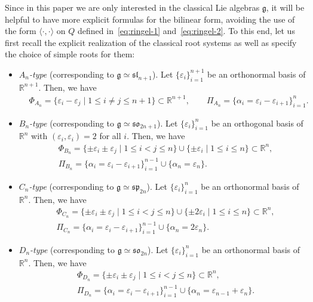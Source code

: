 \documentclass[pdftex]{sigma}
\numberwithin{equation}{section}
\newcommand{\fg}{\mathfrak{g}}
\newcommand{\ssl}{\mathfrak{sl}}
\newcommand{\sso}{\mathfrak{so}}
\newcommand{\ssp}{\mathfrak{sp}}
\begin{document}
Since in this paper we are only interested in the classical Lie algebras $\fg$, it will be helpful to have more explicit formulas for the bilinear form, avoiding the use of the form $\langle \cdot,\cdot \rangle$ on $Q$ defined in~\eqref{eq:ringel-1} and~\eqref{eq:ringel-2}. To this end, let us first recall the explicit realization of the classical root systems as well as specify the choice of simple roots for them:
\begin{itemize}\itemsep=0pt
\item
\emph{$A_{n}$-type} (corresponding to $\fg\simeq \ssl_{n+1}$).
Let $\{\varepsilon_{i}\}_{i=1}^{n+1}$ be an orthonormal basis of $\mathbb{R}^{n+1}$. Then, we have
\begin{align*}
 & \Phi_{A_{n}} = \{\varepsilon_{i} - \varepsilon_{j}\mid 1\leq i\ne j\leq n+1\}
 \subset \mathbb{R}^{n+1}, \qquad
 \Pi_{A_{n}} = \{\alpha_{i} = \varepsilon_{i} - \varepsilon_{i + 1}\}_{i=1}^{n}.
\end{align*}

\item
\emph{$B_{n}$-type} (corresponding to $\fg\simeq \sso_{2n+1}$).
Let $\{\varepsilon_{i}\}_{i=1}^{n}$ be an orthogonal basis of $\mathbb{R}^{n}$ with $(\varepsilon_{i},\varepsilon_{i})=2$ for all $i$. Then, we have
\begin{align*}
 & \Phi_{B_{n}} = \{\pm \varepsilon_{i} \pm \varepsilon_{j}\mid 1 \le i < j \le n\} \cup
 \{\pm \varepsilon_{i}\mid 1\leq i\leq n\} \subset \mathbb{R}^{n}, \\
 & \Pi_{B_{n}} = \{\alpha_{i} = \varepsilon_{i} - \varepsilon_{i + 1}\}_{i=1}^{n-1}
 \cup \{\alpha_{n} = \varepsilon_{n}\}.
\end{align*}

\item
\emph{$C_{n}$-type} (corresponding to $\fg\simeq \ssp_{2n}$).
Let $\{\varepsilon_{i}\}_{i=1}^{n}$ be an orthonormal basis of $\mathbb{R}^{n}$. Then, we have
\begin{align*}
 & \Phi_{C_{n}} = \{\pm \varepsilon_{i} \pm \varepsilon_{j}\mid 1 \le i < j \le n\}
 \cup \{\pm 2\varepsilon_{i}\mid 1\leq i\leq n\} \subset \mathbb{R}^{n}, \\
 & \Pi_{C_{n}} = \{\alpha_{i} = \varepsilon_{i} - \varepsilon_{i + 1}\}_{i=1}^{n-1}
 \cup \{\alpha_{n} = 2\varepsilon_{n}\}.
\end{align*}

\item
\emph{$D_{n}$-type} (corresponding to $\fg\simeq \sso_{2n}$).
Let $\{\varepsilon_{i}\}_{i=1}^{n}$ be an orthonormal basis of $\mathbb{R}^{n}$. Then, we have
\begin{align}
 & \Phi_{D_{n}} = \{\pm \varepsilon_{i} \pm \varepsilon_{j}\mid 1 \le i < j \le n\}
 \subset \mathbb{R}^{n}, \nonumber\\
 & \Pi_{D_{n}} = \{\alpha_{i} = \varepsilon_{i} - \varepsilon_{i + 1}\}_{i=1}^{n-1}
 \cup \{\alpha_{n} = \varepsilon_{n-1} + \varepsilon_{n}\}.\label{eq:D-system}
\end{align}
\end{itemize}
\end{document}
